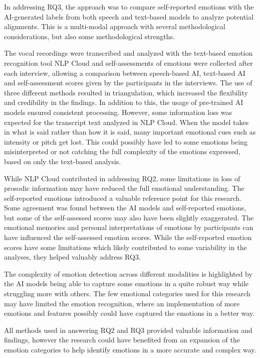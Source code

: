 In addressing RQ3, the approach was to compare self-reported emotions with the AI-generated labels from both speech and text-based models to analyze potential alignments.
This is a multi-modal approach with several methodological considerations, but also some methodological strengths.

The vocal recordings were transcribed and analyzed with the text-based emotion recognition tool NLP Cloud and self-assessments of emotions were collected after each interview, allowing a comparison between speech-based AI, text-based AI and self-assessment scores given by the participants in the interviews. 
The use of three different methods resulted in triangulation, which increased the flexibility and credibility in the findings. In addition to this, the usage of pre-trained AI models ensured consistent processing. However, some information loss was expected for the transcript text analyzed in NLP Cloud. When the model takes in what is said rather than how it is said, many important emotional cues such as intensity or pitch get lost. This could possibly have led to some emotions being misinterpreted or not catching the full complexity of the emotions expressed, based on only the text-based analysis.

While NLP Cloud contributed in addressing RQ2, some limitations in loss of prosodic information may have reduced the full emotional understanding.
The self-reported emotions introduced a valuable reference point for this research. Some agreement was found between the AI models and self-reported emotions, but some of the self-assessed scores may also have been slightly exaggerated. The emotional memories and personal interpretations of emotions by participants can have influenced the self-assessed emotion scores.
While the self-reported emotion scores have some limitations which likely contributed to some variability in the analyses, they helped valuably address RQ3.

The complexity of emotion detection across different modalities is highlighted by the AI models being able to capture some emotions in a quite robust way while struggling more with others. The few emotional categories used for this research may have limited the emotion recognition, where an implementation of more emotions and features possibly could have captured the emotions in a better way.

All methods used in answering RQ2 and RQ3 provided valuable information and findings, however the research could have benefited from an expansion of the emotion categories to help identify emotions in a more accurate and complex way.

